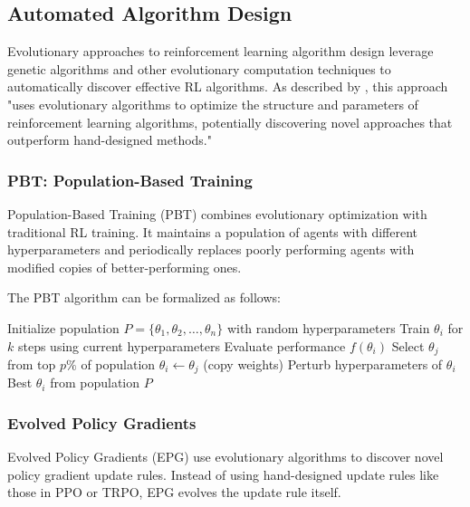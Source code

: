 \documentclass{article}
\begin{document}
\subsection{Automated Algorithm Design}

Evolutionary approaches to reinforcement learning algorithm design leverage genetic algorithms and other evolutionary computation techniques to automatically discover effective RL algorithms. As described by \cite{google2023}, this approach "uses evolutionary algorithms to optimize the structure and parameters of reinforcement learning algorithms, potentially discovering novel approaches that outperform hand-designed methods."

\subsubsection{PBT: Population-Based Training}

Population-Based Training (PBT) combines evolutionary optimization with traditional RL training. It maintains a population of agents with different hyperparameters and periodically replaces poorly performing agents with modified copies of better-performing ones.

The PBT algorithm can be formalized as follows:

\begin{algorithm}
\begin{algorithmic}[1]
\STATE Initialize population $P = \{\theta_1, \theta_2, \ldots, \theta_n\}$ with random hyperparameters
        \STATE Train $\theta_i$ for $k$ steps using current hyperparameters
        \STATE Evaluate performance $f(\theta_i)$
    \ENDFOR
            \STATE Select $\theta_j$ from top $p\%$ of population
            \STATE $\theta_i \leftarrow \theta_j$ (copy weights)
            \STATE Perturb hyperparameters of $\theta_i$
        \ENDIF
    \ENDFOR
\ENDWHILE
\RETURN Best $\theta_i$ from population $P$
\end{algorithmic}
\end{algorithm}

\subsubsection{Evolved Policy Gradients}

Evolved Policy Gradients (EPG) use evolutionary algorithms to discover novel policy gradient update rules. Instead of using hand-designed update rules like those in PPO or TRPO, EPG evolves the update rule itself.
\end{document}

